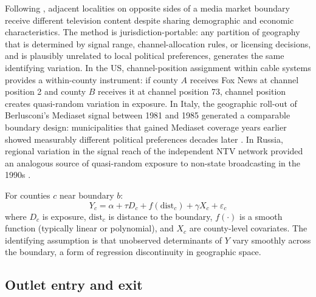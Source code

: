 Following \textcite{gentzkow2010}, adjacent localities on opposite sides of a media market boundary receive different television content despite sharing demographic and economic characteristics.
The method is jurisdiction-portable: any partition of geography that is determined by signal range, channel-allocation rules, or licensing decisions, and is plausibly unrelated to local political preferences, generates the same identifying variation.
In the US, channel-position assignment within cable systems provides a within-county instrument: if county $A$ receives Fox News at channel position 2 and county $B$ receives it at channel position 73, channel position creates quasi-random variation in exposure.
In Italy, the geographic roll-out of Berlusconi's Mediaset signal between 1981 and 1985 generated a comparable boundary design: municipalities that gained Mediaset coverage years earlier showed measurably different political preferences decades later \autocite{durante2019}.
In Russia, regional variation in the signal reach of the independent NTV network provided an analogous source of quasi-random exposure to non-state broadcasting in the 1990s \autocite{enikolopov2011}.

\begin{model}
\label{mod:media-boundary}
For counties $c$ near boundary $b$:
\[
  Y_c = \alpha + \tau D_c + f(\text{dist}_c) + \gamma X_c + \varepsilon_c
\]
where $D_c$ is exposure, $\text{dist}_c$ is distance to the boundary, $f(\cdot)$ is a smooth function (typically linear or polynomial), and $X_c$ are county-level covariates.
The identifying assumption is that unobserved determinants of $Y$ vary smoothly across the boundary, a form of regression discontinuity in geographic space.
\end{model}

\subsection{Outlet entry and exit}

